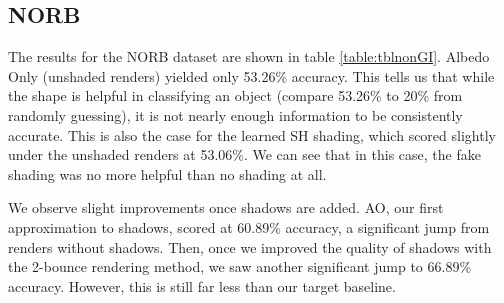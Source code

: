 \documentclass[10pt,twocolumn,letterpaper]{article}
\begin{document}
\subsection{NORB}
The results for the NORB dataset are shown in table \ref{table:tblnonGI}. Albedo Only (unshaded renders) yielded only 53.26\% accuracy. This tells us that while the shape is helpful in classifying an object (compare 53.26\% to 20\% from randomly guessing), it is not nearly enough information to be consistently accurate. This is also the case for the learned SH shading, which scored slightly under the unshaded renders at 53.06\%. We can see that in this case, the fake shading was no more helpful than no shading at all.

We observe slight improvements once shadows are added. AO, our first approximation to shadows, scored at 60.89\% accuracy, a significant jump from renders without shadows. Then, once we improved the quality of shadows with the 2-bounce rendering method, we saw another significant jump to 66.89\% accuracy. However, this is still far less than our target baseline.
\end{document}
